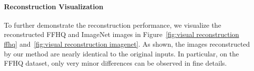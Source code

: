 


\paragraph{Reconstruction Visualization}
To further demonstrate the reconstruction performance, we visualize the reconstructed FFHQ and ImageNet images in Figure~\ref{fig:visual reconstruction ffhq} and~\ref{fig:visual reconstruction imagenet}. As shown, the images reconstructed by our method are nearly identical to the original inputs. In particular, on the FFHQ dataset, only very minor differences can be observed in fine details. 
\vspace{-1ex}

